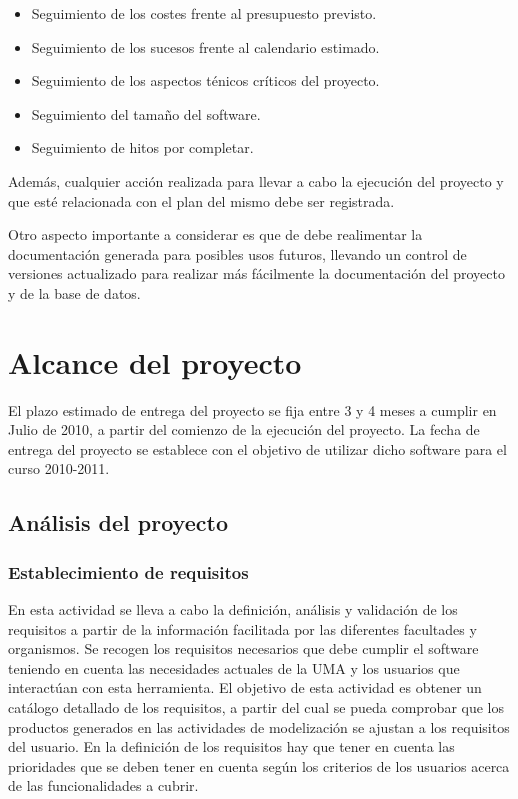 \documentclass[11pt,a4paper,spanish,twoside]{report}
\begin{document}
\begin{itemize}
\item Seguimiento de los costes frente al presupuesto previsto.
\item Seguimiento de los sucesos frente al calendario estimado.
\item Seguimiento de los aspectos ténicos críticos del proyecto.
\item Seguimiento del tamaño del software.
\item Seguimiento de hitos por completar.
\end{itemize}

Además, cualquier acción realizada para llevar a cabo la ejecución del 
proyecto y que esté relacionada con el plan del mismo debe ser registrada.

Otro aspecto importante a considerar es que de debe realimentar la 
documentación generada para posibles usos futuros, llevando un control de 
versiones actualizado para realizar más fácilmente la documentación del 
proyecto y de la base de datos.

\chapter{Alcance del proyecto}
El plazo estimado de entrega del proyecto se fija entre 3 y 4 meses a cumplir
en Julio de 2010, a partir del comienzo de la ejecución del proyecto. La
fecha de entrega del proyecto se establece con el objetivo de utilizar dicho
software para el curso 2010-2011. 
\section{Análisis del proyecto}
\subsection{Establecimiento de requisitos}
En esta actividad se lleva a cabo la definición, análisis y validación de los
requisitos a partir de la información facilitada por las diferentes
facultades y organismos. Se recogen los requisitos necesarios que debe
cumplir el software teniendo en cuenta las necesidades actuales de la UMA y
los usuarios que interactúan con esta herramienta. 
El objetivo de esta actividad es obtener un catálogo detallado de los
requisitos, a partir del cual se pueda comprobar que los productos generados
en las actividades de modelización se ajustan a los requisitos del usuario.
En la definición de los requisitos hay que tener en cuenta las prioridades
que se deben tener en cuenta según los criterios de los usuarios
acerca de las funcionalidades a cubrir. 
\end{document}
